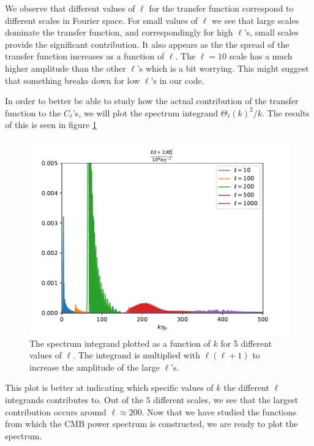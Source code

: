 \documentclass{aa}
\begin{document}
We observe that different values of $\ell$ for the transfer function correspond to different scales in Fourier space. For small values of $\ell$ we see that large scales dominate the transfer function, and correspondingly for high $\ell$'s, small scales provide the significant contribution. It also appears as the the spread of the transfer function increases as a function of $\ell$. The $\ell = 10$ scale has a much higher amplitude than the other $\ell$'s which is a bit worrying. This might suggest that something breaks down for low $\ell$'s in our code.

In order to better be able to study how the actual contribution of the transfer function to the $C_\ell$'s, we will plot the spectrum integrand $\Theta_\ell (k)^2/k$. The results of this is seen in figure \ref{fig:M4_stf}
\begin{figure}[h!]
   \includegraphics[scale=0.5]{Figures/milestone_4/scaled_transfer_function.pdf}
   \caption{The spectrum integrand plotted as a function of $k$ for 5 different values of $\ell$. The integrand is multiplied with $\ell(\ell +1)$ to increase the amplitude of the large $\ell$'s.
   }\label{fig:M4_stf}
\end{figure}
This plot is better at indicating which specific values of $k$ the different $\ell$ integrands contributes to. Out of the $5$ different scales, we see that the largest contribution occurs around $\ell \approx 200$. Now that we have studied the functions from which the CMB power spectrum is constructed, we are ready to plot the spectrum. 
\end{document}
